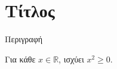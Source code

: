 \section{Τίτλος}


\begin{theorem}
Περιγραφή
\end{theorem}


\begin{lemma}
Για κάθε $x\in\mathbb{R}$, ισχύει $x^2\geq 0$.
\end{lemma}
